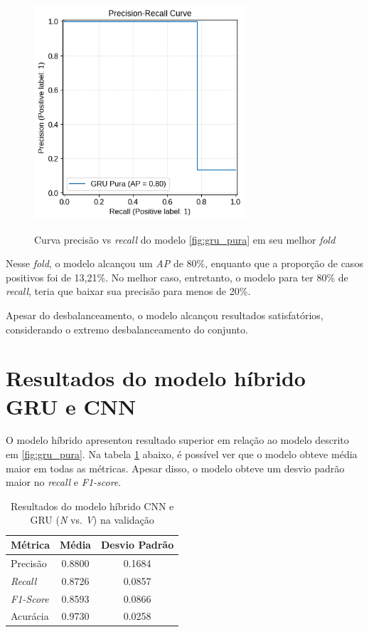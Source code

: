 \begin{figure}[H]
  \centering
  \caption{Curva precisão vs \textit{recall} do modelo \ref{fig:gru_pura} em seu melhor \textit{fold}}
   \includegraphics[width=0.7\textwidth]{figuras/modelos_resultados/gru/ap_gru_melhor_fold.png} %
  \label{fig:ap_gru_melhor_fold}
\end{figure}

Nesse \textit{fold}, o modelo alcançou um \textit{AP} de 80\%, enquanto que a proporção de casos positivos foi de 13,21\%. No melhor caso, 
entretanto, o modelo para ter 80\% de \textit{recall}, teria que baixar sua precisão para menos de 20\%. 

Apesar do desbalanceamento, o modelo alcançou resultados satisfatórios, considerando o extremo desbalanceamento do conjunto.

\section{Resultados do modelo híbrido GRU e CNN}
\label{sec:resultados_gru_cnn}

O modelo híbrido apresentou resultado superior em relação ao modelo descrito em \ref{fig:gru_pura}. Na tabela \ref{tab:resultado_cv_gru_cnn_validacao}
abaixo, é possível ver que o modelo obteve média maior em todas as métricas. Apesar disso, o modelo obteve um desvio padrão maior 
no \textit{recall} e \textit{F1-score}. 

\begin{table}[H]
\centering
\caption{Resultados do modelo híbrido CNN e GRU (\textit{N} vs. \textit{V}) na validação}
\label{tab:resultado_cv_gru_cnn_validacao}
\begin{tabular}{lcc}
\hline
\textbf{Métrica} & \textbf{Média} & \textbf{Desvio Padrão} \\
\hline
Precisão & 0.8800 &  0.1684 \\
\textit{Recall} & 0.8726  & 0.0857 \\
\textit{F1-Score} & 0.8593 & 0.0866 \\
Acurácia & 0.9730 & 0.0258 \\
\hline
\end{tabular}
\end{table}


